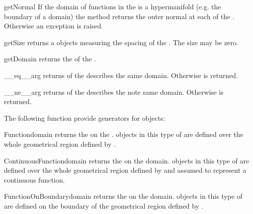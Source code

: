\begin{methoddesc}[FunctionSpace]{getNormal}{}
If the domain of functions in the \FunctionSpace 
is a hypermanifold (e.g. the boundary of a domain)
the method returns the outer normal at each of the 
\DataSamplePoints. Otherwise an exception is raised.
\end{methoddesc}

\begin{methoddesc}[FunctionSpace]{getSize}{}
returns a \Data objects measuring the spacing of the \DataSamplePoints.  
The size may be zero.
\end{methoddesc}

\begin{methoddesc}[FunctionSpace]{getDomain}{}
returns the \Domain of the \FunctionSpace.
\end{methoddesc}

\begin{methoddesc}[FunctionSpace]{__eq__}{arg}
returns \True of the \Domain {} describes the same domain. Otherwise
\False is returned.
\end{methoddesc}

\begin{methoddesc}[FunctionSpace]{__ne__}{arg}
returns \True of the \Domain {} describes the note same domain. 
Otherwise \False is returned.
\end{methoddesc}

The following function provide generators for \FunctionSpace objects:
\begin{funcdesc}{Function}{domain}
returns the \Function on the \Domain {}. \Data objects in this type of \Function
are defined over the whole geometrical region defined by . 
\end{funcdesc}

\begin{funcdesc}{ContinuousFunction}{domain}
returns the \ContinuousFunction on the \Domain domain. \Data objects in this type of \Function
are defined over the whole geometrical region defined by  and assumed to represent
a continuous function.
\end{funcdesc}

\begin{funcdesc}{FunctionOnBoundary}{domain}
returns the \ContinuousFunction on the \Domain domain. \Data objects in this type of \Function
are defined on the boundary of the geometrical region defined by . 
\end{funcdesc}

